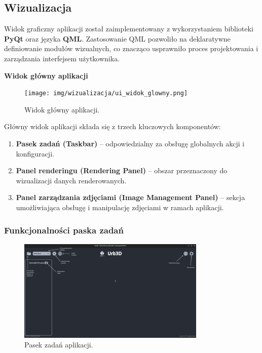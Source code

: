 \subsection{Wizualizacja}

Widok graficzny aplikacji został zaimplementowany z wykorzystaniem biblioteki \textbf{PyQt} oraz języka \textbf{QML}. Zastosowanie QML pozwoliło na deklaratywne definiowanie modułów wizualnych, co znacząco usprawniło proces projektowania i zarządzania interfejsem użytkownika.

\textbf{Widok główny aplikacji}
\begin{figure}[h!]
    \centering
    \texttt{[image: img/wizualizacja/ui\_widok\_glowny.png]}
    \caption{Widok główny aplikacji.}
\end{figure}

Główny widok aplikacji składa się z trzech kluczowych komponentów:
\begin{enumerate}
    \item \textbf{Pasek zadań (Taskbar)} -- odpowiedzialny za obsługę globalnych akcji i konfiguracji.
    \item \textbf{Panel renderingu (Rendering Panel)} -- obszar przeznaczony do wizualizacji danych renderowanych.
    \item \textbf{Panel zarządzania zdjęciami (Image Management Panel)} -- sekcja umożliwiająca obsługę i manipulację zdjęciami w ramach aplikacji.
\end{enumerate}

\subsubsection{Funkcjonalności paska zadań}
\begin{figure}[h!]
    \centering
    \includegraphics[width=0.8\textwidth]{img/wizualizacja/ui_opis_funk.png}
    \caption{Pasek zadań aplikacji.}
\end{figure}

